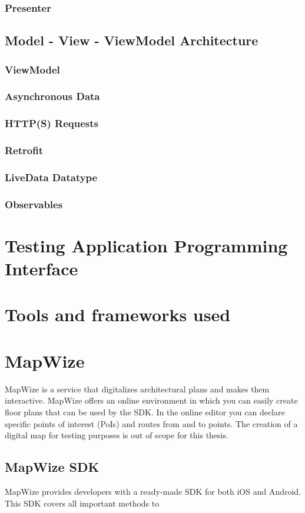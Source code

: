 \subsubsection{Presenter}
\subsection{Model - View - ViewModel Architecture}
\subsubsection{ViewModel}
\subsubsection{Asynchronous Data}
\subsubsection{HTTP(S) Requests}
\subsubsection{Retrofit}
\subsubsection{LiveData Datatype}
\subsubsection{Observables}
\section{Testing Application Programming Interface}
\section{Tools and frameworks used}
\section{MapWize}
MapWize is a service that digitalizes architectural plans and makes them interactive. MapWize offers an online environment in which you can easily create floor plans that can be used by the SDK. In the online editor you can declare specific points of interest (PoIs) and routes from and to points. The creation of a digital map for testing purposes is out of scope for this thesis. 

\subsection{MapWize SDK}
MapWize provides developers with a ready-made SDK for both iOS and Android. This SDK covers all important methods to 
